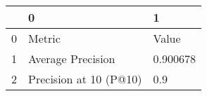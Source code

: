 \begin{tabular}{lll}
\toprule
{} &                       0 &         1 \\
\midrule
0 &                  Metric &     Value \\
1 &       Average Precision &  0.900678 \\
2 &  Precision at 10 (P@10) &       0.9 \\
\bottomrule
\end{tabular}

